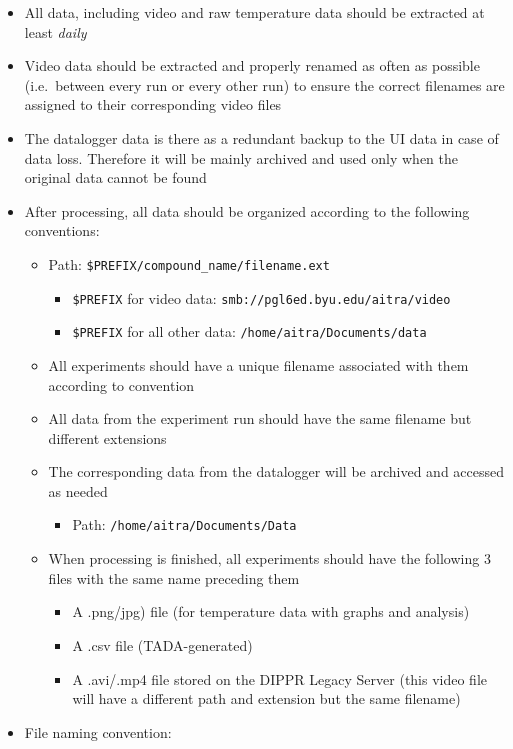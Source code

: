 \begin{itemize}
\item
  All data, including video and raw temperature data should be extracted
  at least \emph{daily}
\item
  Video data should be extracted and properly renamed as often as
  possible (i.e.~between every run or every other run) to ensure the
  correct filenames are assigned to their corresponding video files
\item
  The datalogger data is there as a redundant backup to the UI data in
  case of data loss. Therefore it will be mainly archived and used only
  when the original data cannot be found
\item
  After processing, all data should be organized according to the
  following conventions:

  \begin{itemize}
  \tightlist
  \item
    Path: \texttt{\$PREFIX/compound\_name/filename.ext}

    \begin{itemize}
    \tightlist
    \item
      \texttt{\$PREFIX} for video data:
      \texttt{smb://pgl6ed.byu.edu/aitra/video}
    \item
      \texttt{\$PREFIX} for all other data:
      \texttt{/home/aitra/Documents/data}
    \end{itemize}
  \item
    All experiments should have a unique filename associated with them
    according to convention
  \item
    All data from the experiment run should have the same filename but
    different extensions
  \item
    The corresponding data from the datalogger will be archived and
    accessed as needed

    \begin{itemize}
    \tightlist
    \item
      Path: \texttt{/home/aitra/Documents/Data}
    \end{itemize}
  \item
    When processing is finished, all experiments should have the
    following 3 files with the same name preceding them

    \begin{itemize}
    \tightlist
    \item
      A .png/jpg) file (for temperature data with graphs and analysis)
    \item
      A .csv file (TADA-generated)
    \item
      A .avi/.mp4 file stored on the DIPPR Legacy Server (this video
      file will have a different path and extension but the same
      filename)
    \end{itemize}
  \end{itemize}
\item
  File naming convention:


\end{itemize}
